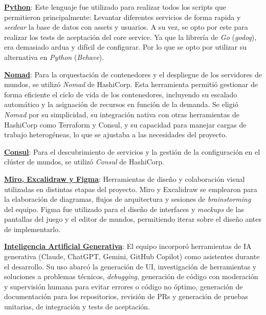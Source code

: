 \vspace{0.25cm}

\textbf{\underline{Python}}: Este lenguaje fue utilizado para realizar todos los scripts que permitieron principalmente: 
Levantar diferentes servicios de forma rapida y \textit{seedear} la base de datos con assets y usuarios. A su vez, se opto 
por este para realizar los tests de aceptación del core service. Ya que la librería de \textit{Go} (\textit{godog}), 
era demasiado ardua y difícil de configurar. Por lo que se opto por utilizar su alternativa en \textit{Python} (\textit{Behave}).

\vspace{0.25cm}

\textbf{\underline{Nomad}}:
Para la orquestación de contenedores y el despliegue de los servidores de mundos, se utilizó \textit{Nomad} de HashiCorp.
Esta herramienta permitió gestionar de forma eficiente el ciclo de vida de los contenedores, incluyendo su escalado automático y la
asignación de recursos en función de la demanda. Se eligió \textit{Nomad} por su simplicidad, 
su integración nativa con otras herramientas de HashiCorp como Terraform y Consul, y su capacidad para manejar cargas de trabajo heterogéneas, 
lo que se ajustaba a las necesidades del proyecto.

\vspace{0.25cm}

\textbf{\underline{Consul}}:
Para el descubrimiento de servicios y la gestión de la configuración en el clúster de mundos, se utilizó \textit{Consul} de HashiCorp.

\vspace{0.25cm}

\textbf{\underline{Miro, Excalidraw y Figma}}: Herramientas de diseño y colaboración visual utilizadas en distintas etapas 
del proyecto. Miro y Excalidraw se emplearon para la elaboración de diagramas, flujos de arquitectura y sesiones de \textit{brainstorming} 
del equipo. Figma fue utilizado para el diseño de interfaces y \textit{mockups} de las pantallas del juego y el editor de mundos, 
permitiendo iterar sobre el diseño antes de implementarlo.

\vspace{0.25cm}

\textbf{\underline{Inteligencia Artificial Generativa}}: El equipo incorporó herramientas de IA generativa (Claude, ChatGPT, 
Gemini, GitHub Copilot) como asistentes durante el desarrollo. Su uso abarcó la generación de UI, investigación de herramientas 
y soluciones a problemas técnicos, \textit{debugging}, generación de código con moderación y supervisión humana para evitar 
errores o código no óptimo, generación de documentación para los repositorios, revisión de PRs y generación de pruebas unitarias, 
de integración y tests de aceptación.

